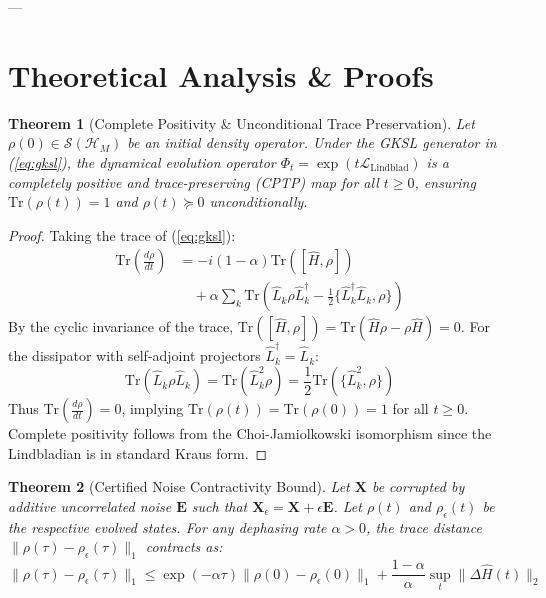 \documentclass[journal,twocolumn,10pt]{IEEEtran}
\newtheorem{theorem}{Theorem}
\begin{document}
---

\section{Theoretical Analysis \& Proofs}

\begin{theorem}[Complete Positivity \& Unconditional Trace Preservation]
Let $\rho(0) \in \mathcal{S}(\mathcal{H}_M)$ be an initial density operator. Under the GKSL generator in (\ref{eq:gksl}), the dynamical evolution operator $\Phi_t = \exp(t \mathcal{L}_{\mathrm{Lindblad}})$ is a completely positive and trace-preserving (CPTP) map for all $t \ge 0$, ensuring $\mathrm{Tr}(\rho(t)) = 1$ and $\rho(t) \succeq 0$ unconditionally.
\end{theorem}

\begin{proof}
Taking the trace of (\ref{eq:gksl}):
\begin{align*}
\mathrm{Tr}\left(\frac{d\rho}{dt}\right) &= -i(1-\alpha)\mathrm{Tr}([\hat{H}, \rho]) \\
&\quad + \alpha \sum_k \mathrm{Tr}\left(\hat{L}_k \rho \hat{L}_k^\dagger - \frac{1}{2}\{\hat{L}_k^\dagger \hat{L}_k, \rho\}\right)
\end{align*}
By the cyclic invariance of the trace, $\mathrm{Tr}([\hat{H}, \rho]) = \mathrm{Tr}(\hat{H}\rho - \rho\hat{H}) = 0$. For the dissipator with self-adjoint projectors $\hat{L}_k^\dagger = \hat{L}_k$:
\begin{equation*}
\mathrm{Tr}(\hat{L}_k \rho \hat{L}_k) = \mathrm{Tr}(\hat{L}_k^2 \rho) = \frac{1}{2}\mathrm{Tr}(\{\hat{L}_k^2, \rho\})
\end{equation*}
Thus $\mathrm{Tr}\left(\frac{d\rho}{dt}\right) = 0$, implying $\mathrm{Tr}(\rho(t)) = \mathrm{Tr}(\rho(0)) = 1$ for all $t \ge 0$. Complete positivity follows from the Choi-Jamiolkowski isomorphism since the Lindbladian is in standard Kraus form.
\end{proof}

\begin{theorem}[Certified Noise Contractivity Bound]
Let $\mathbf{X}$ be corrupted by additive uncorrelated noise $\mathbf{E}$ such that $\mathbf{X}_\epsilon = \mathbf{X} + \epsilon \mathbf{E}$. Let $\rho(t)$ and $\rho_\epsilon(t)$ be the respective evolved states. For any dephasing rate $\alpha > 0$, the trace distance $\|\rho(\tau) - \rho_\epsilon(\tau)\|_1$ contracts as:
\begin{equation}
\|\rho(\tau) - \rho_\epsilon(\tau)\|_1 \le \exp(-\alpha \tau) \|\rho(0) - \rho_\epsilon(0)\|_1 + \frac{1-\alpha}{\alpha} \sup_{t} \|\Delta \hat{H}(t)\|_2
\end{equation}
\end{theorem}
\end{document}
